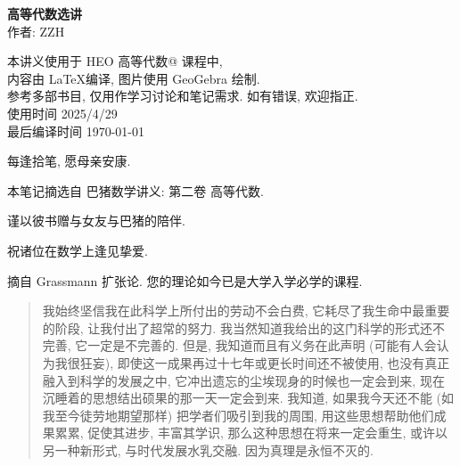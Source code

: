 \documentclass[UTF8]{book}
\makeatletter
\newcommand{\Rmnum}[1]{\expandafter\@slowromancap\romannumeral #1@}
\makeatother
\begin{document}



\begin{titlepage}
    \vspace*{10em}
\begin{center}
    \textbf{\songti 高等代数选讲} \\ %
    \vspace{4em} %
    作者: ZZH \\ %
    \vspace{10em} %

    本讲义使用于 HEO 高等代数\Rmnum{2} 课程中, \\
    内容由 \LaTeX 编译, 图片使用 GeoGebra 绘制. \\
    参考多部书目, 仅用作学习讨论和笔记需求. 如有错误, 欢迎指正. \\
    使用时间 2025/4/29\\

    最后编译时间 \today\\
\end{center}

\end{titlepage} 

\newpage

\vspace*{5em}

每逢拾笔, 愿母亲安康. 

本笔记摘选自 巴猪数学讲义: 第二卷 高等代数. 

谨以彼书赠与女友与巴猪的陪伴. 

祝诸位在数学上逢见挚爱. 

\vspace*{5em}

摘自 Grassmann 扩张论. 您的理论如今已是大学入学必学的课程. 

\begin{quotation}
    \kaishu
    我始终坚信我在此科学上所付出的劳动不会白费, 它耗尽了我生命中最重要的阶段, 
    让我付出了超常的努力. 我当然知道我给出的这门科学的形式还不完善, 
    它一定是不完善的. 但是, 我知道而且有义务在此声明 (可能有人会认为我很狂妄), 
    即使这一成果再过十七年或更长时间还不被使用, 也没有真正融入到科学的发展之中, 
    它冲出遗忘的尘埃现身的时候也一定会到来, 现在沉睡着的思想结出硕果的那一天一定会到来. 
    我知道, 如果我今天还不能 (如我至今徒劳地期望那样) 把学者们吸引到我的周围, 
    用这些思想帮助他们成果累累, 促使其进步, 丰富其学识, 
    那么这种思想在将来一定会重生, 或许以另一种新形式, 与时代发展水乳交融. 
    因为真理是永恒不灭的. 
    \songti
\end{quotation}
\end{document}
